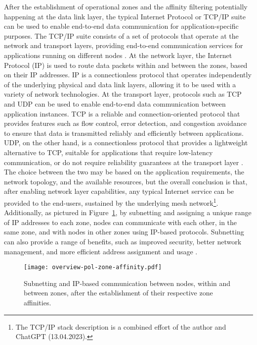 After the establishment of operational zones and the affinity filtering potentially happening at the data link layer, the typical Internet Protocol or TCP/IP suite can be used to enable end-to-end data communication for application-specific purposes. The TCP/IP suite consists of a set of protocols that operate at the network and transport layers, providing end-to-end communication services for applications running on different nodes \cite{peterson2007computer}. At the network layer, the Internet Protocol (IP) is used to route data packets within and between the zones, based on their IP addresses. IP is a connectionless protocol that operates independently of the underlying physical and data link layers, allowing it to be used with a variety of network technologies. At the transport layer, protocols such as TCP and UDP can be used to enable end-to-end data communication between application instances. TCP is a reliable and connection-oriented protocol that provides features such as flow control, error detection, and congestion avoidance to ensure that data is transmitted reliably and efficiently between applications. UDP, on the other hand, is a connectionless protocol that provides a lightweight alternative to TCP, suitable for applications that require low-latency communication, or do not require reliability guarantees at the transport layer \cite{peterson2007computer}. The choice between the two may be based on the application requirements, the network topology, and the available resources, but the overall conclusion is that, after enabling network layer capabilities, any typical Internet service can be provided to the end-users, sustained by the underlying mesh network\footnote{The TCP/IP stack description is a combined effort of the author and ChatGPT (13.04.2023).}. Additionally, as pictured in Figure~\ref{fig:proof-of-location-overview-pol-zone-affinity}, by subnetting and assigning a unique range of IP addresses to each zone, nodes can communicate with each other, in the same zone, and with nodes in other zones using IP-based protocols. Subnetting can also provide a range of benefits, such as improved security, better network management, and more efficient address assignment and usage \cite{peterson2007computer}.

\begin{figure}[h!]
    \begin{center}
    \texttt{[image: overview-pol-zone-affinity.pdf]}
    \caption{Subnetting and IP-based communication between nodes, within and between zones, after the establishment of their respective zone affinities.}
    \label{fig:proof-of-location-overview-pol-zone-affinity}
    \end{center}
\end{figure}


